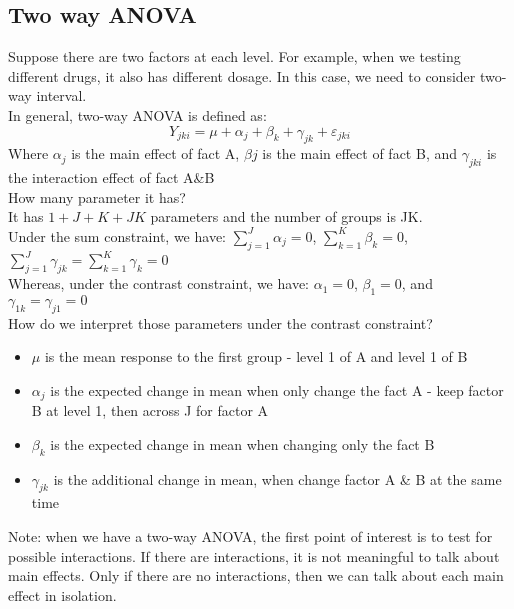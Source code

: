 \documentclass[12pt ]{article}
\begin{document}
\subsection{Two way ANOVA}
Suppose there are two factors at each level. For example, when we testing different drugs, it also has different dosage. In this case, we need to consider two-way interval. \\

In general, two-way ANOVA is defined as:
\begin{equation*}
Y_{jki} = \mu + \alpha_{j} + \beta_{k} + \gamma_{jk} + \varepsilon_{jki}
\end{equation*}
Where $\alpha_{j}$ is the main effect of fact A, $\beta{j}$ is the main effect of fact B, and $\gamma_{jki}$ is the interaction effect of fact A\&B \\
How many parameter it has? \\
It has $1 + J + K + JK$ parameters and the number of groups is JK. \\

\noindent
Under the sum constraint, we have: $\sum_{j=1}^{J} \alpha_{j} = 0$, $\sum_{k=1}^{K} \beta_{k} = 0$, $\sum_{j=1}^{J} \gamma_{jk} = \sum_{k=1}^{K} \gamma_{k} = 0$\\
Whereas, under the contrast constraint, we have: $\alpha_{1} = 0$, $\beta_{1} = 0$, and $\gamma_{1k} = \gamma_{j1} =  0$ \\

How do we interpret those parameters under the contrast constraint?
\begin{itemize}
\item $\mu$ is the mean response to the first group - level 1 of A and level 1 of B
\item $\alpha_{j}$ is the expected change in mean when only change the fact A - keep factor B at level 1, then across J for factor A
\item $\beta_{k}$ is the expected change in mean when changing only the fact B
\item $\gamma_{jk}$ is the additional change in mean, when change factor A \& B at the same time
\end{itemize}
Note: when we have a two-way ANOVA, the first point of interest is to test for possible interactions. If there are interactions, it is not meaningful to talk about main effects. Only if there are no interactions, then we can talk about each main effect in isolation.
\end{document}
